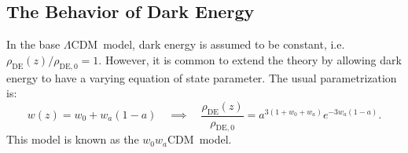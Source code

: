 \documentclass{lkx_paper}
\newcommand{\DE}{{\mathrm{DE}}}
\newcommand{\LCDM}{$\Lambda\mathrm{CDM}$~}
\newcommand{\wwCDM}{{$w_0 w_a\mathrm{CDM}$~}}
\begin{document}
\subsection*{The Behavior of Dark Energy}

In the base \LCDM model, dark energy is assumed to be constant, i.e. $\rho_\DE(z)/\rho_{\DE,0}=1$. However, it is common to extend the theory by allowing dark energy to have a varying equation of state parameter. The usual parametrization is:
\begin{equation}
w(z)=w_0+w_a(1-a)\quad\implies\quad
  \frac{\rho_\DE(z)}{\rho_{\DE,0}} = a^{3(1+w_0+w_a)}e^{-3w_a(1-a)}.
\end{equation}
This model is known as the \wwCDM model.
\end{document}
